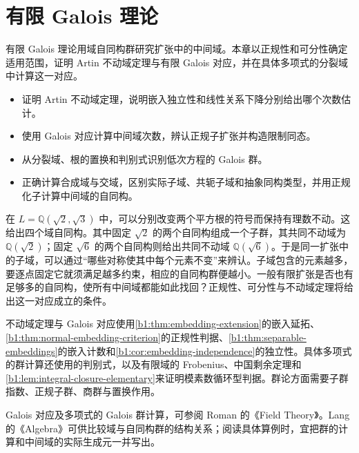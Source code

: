 
\chapter{有限 Galois 理论}
\label{b1:ch:19}

\begin{chapterabstract}
	有限 Galois 理论用域自同构群研究扩张中的中间域。本章以正规性和可分性确定适用范围，证明 Artin 不动域定理与有限 Galois 对应，并在具体多项式的分裂域中计算这一对应。
\end{chapterabstract}

\begin{learninggoals}
	\begin{itemize}
		\item 证明 Artin 不动域定理，说明嵌入独立性和线性关系下降分别给出哪个次数估计。
		\item 使用 Galois 对应计算中间域次数，辨认正规子扩张并构造限制同态。
		\item 从分裂域、根的置换和判别式识别低次方程的 Galois 群。
		\item 正确计算合成域与交域，区别实际子域、共轭子域和抽象同构类型，并用正规化子计算中间域的自同构。
	\end{itemize}
\end{learninggoals}

在 \(L=\mathbb Q(\sqrt2,\sqrt3)\) 中，可以分别改变两个平方根的符号而保持有理数不动。这给出四个域自同构。其中固定 \(\sqrt2\) 的两个自同构组成一个子群，其共同不动域为 \(\mathbb Q(\sqrt2)\)；固定 \(\sqrt6\) 的两个自同构则给出共同不动域 \(\mathbb Q(\sqrt6)\)。于是同一扩张中的子域，可以通过“哪些对称使其中每个元素不变”来辨认。子域包含的元素越多，要逐点固定它就须满足越多约束，相应的自同构群便越小。一般有限扩张是否也有足够多的自同构，使所有中间域都能如此找回？正规性、可分性与不动域定理将给出这一对应成立的条件。

\ProseParagraphBreak

不动域定理与 Galois 对应使用\cref{b1:thm:embedding-extension}的嵌入延拓、\cref{b1:thm:normal-embedding-criterion}的正规性判据、\cref{b1:thm:separable-embeddings}的嵌入计数和\cref{b1:cor:embedding-independence}的独立性。具体多项式的群计算还使用的判别式，以及有限域的 Frobenius、中国剩余定理和\cref{b1:lem:integral-closure-elementary}来证明模素数循环型判据。群论方面需要子群指数、正规子群、商群与置换作用。

\ProseParagraphBreak
Galois 对应及多项式的 Galois 群计算，可参阅 Roman 的《Field Theory》\cite[Sections 6.2--6.5, 7.1, 7.4--7.5]{Roman2006FieldTheory}。Lang 的《Algebra》\cite[Chapter VI, \S\S 1--2]{Lang2002}可供比较域与自同构群的结构关系；阅读具体算例时，宜把群的计算和中间域的实际生成元一并写出。

